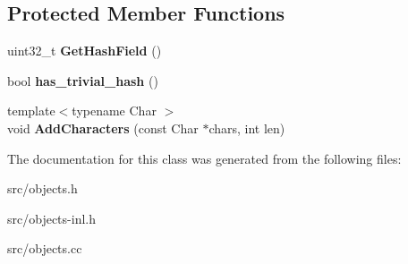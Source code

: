 \subsection*{Protected Member Functions}
\begin{DoxyCompactItemize}
\item 
\hypertarget{classv8_1_1internal_1_1_string_hasher_a24cb87423be59db3fe160354f68d7a96}{}uint32\+\_\+t {\bfseries Get\+Hash\+Field} ()\label{classv8_1_1internal_1_1_string_hasher_a24cb87423be59db3fe160354f68d7a96}

\item 
\hypertarget{classv8_1_1internal_1_1_string_hasher_ae1dc7e4c63246108c06add8f976a3972}{}bool {\bfseries has\+\_\+trivial\+\_\+hash} ()\label{classv8_1_1internal_1_1_string_hasher_ae1dc7e4c63246108c06add8f976a3972}

\item 
\hypertarget{classv8_1_1internal_1_1_string_hasher_a77e937ce030d8be14c67cbf03f5b6980}{}{\footnotesize template$<$typename Char $>$ }\\void {\bfseries Add\+Characters} (const Char $\ast$chars, int len)\label{classv8_1_1internal_1_1_string_hasher_a77e937ce030d8be14c67cbf03f5b6980}

\end{DoxyCompactItemize}


The documentation for this class was generated from the following files\+:\begin{DoxyCompactItemize}
\item 
src/objects.\+h\item 
src/objects-\/inl.\+h\item 
src/objects.\+cc\end{DoxyCompactItemize}
